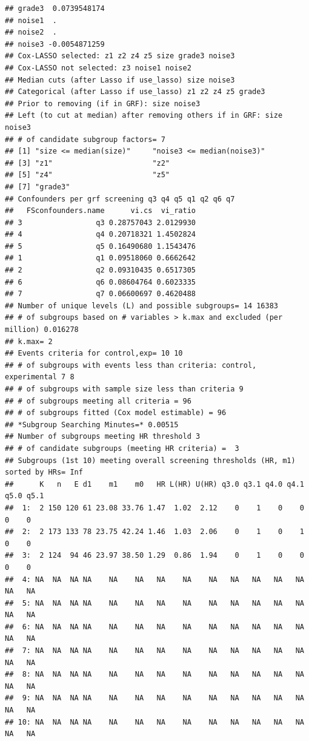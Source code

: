 \documentclass[smallextended]{svjour3}
\makeatletter
\newenvironment{kframe}{%
 \def\at@end@of@kframe{}%
 \ifinner\ifhmode%
  \def\at@end@of@kframe{\end{minipage}}%
  \begin{minipage}{\columnwidth}%
 \fi\fi%
 \def\FrameCommand##1{\hskip\@totalleftmargin \hskip-\fboxsep
 \colorbox{shadecolor}{##1}\hskip-\fboxsep
     \hskip-\linewidth \hskip-\@totalleftmargin \hskip\columnwidth}%
 \MakeFramed {\advance\hsize-\width
   \@totalleftmargin\z@ \linewidth\hsize
   \@setminipage}}%
 {\par\unskip\endMakeFramed%
 \at@end@of@kframe}
\newenvironment{knitrout}{}{} %
\makeatother
\begin{document}
\begin{knitrout}
\begin{kframe}
\begin{verbatim}
## grade3  0.0739548174
## noise1  .           
## noise2  .           
## noise3 -0.0054871259
## Cox-LASSO selected: z1 z2 z4 z5 size grade3 noise3 
## Cox-LASSO not selected: z3 noise1 noise2 
## Median cuts (after Lasso if use_lasso) size noise3 
## Categorical (after Lasso if use_lasso) z1 z2 z4 z5 grade3 
## Prior to removing (if in GRF): size noise3 
## Left (to cut at median) after removing others if in GRF: size noise3 
## # of candidate subgroup factors= 7 
## [1] "size <= median(size)"     "noise3 <= median(noise3)"
## [3] "z1"                       "z2"                      
## [5] "z4"                       "z5"                      
## [7] "grade3"                  
## Confounders per grf screening q3 q4 q5 q1 q2 q6 q7 
##   FSconfounders.name      vi.cs  vi_ratio
## 3                 q3 0.28757043 2.0129930
## 4                 q4 0.20718321 1.4502824
## 5                 q5 0.16490680 1.1543476
## 1                 q1 0.09518060 0.6662642
## 2                 q2 0.09310435 0.6517305
## 6                 q6 0.08604764 0.6023335
## 7                 q7 0.06600697 0.4620488
## Number of unique levels (L) and possible subgroups= 14 16383 
## # of subgroups based on # variables > k.max and excluded (per million) 0.016278 
## k.max= 2 
## Events criteria for control,exp= 10 10 
## # of subgroups with events less than criteria: control, experimental 7 8 
## # of subgroups with sample size less than criteria 9 
## # of subgroups meeting all criteria = 96 
## # of subgroups fitted (Cox model estimable) = 96 
## *Subgroup Searching Minutes=* 0.00515 
## Number of subgroups meeting HR threshold 3 
## # of candidate subgroups (meeting HR criteria) =  3 
## Subgroups (1st 10) meeting overall screening thresholds (HR, m1) sorted by HRs= Inf 
##      K   n   E d1    m1    m0   HR L(HR) U(HR) q3.0 q3.1 q4.0 q4.1 q5.0 q5.1
##  1:  2 150 120 61 23.08 33.76 1.47  1.02  2.12    0    1    0    0    0    0
##  2:  2 173 133 78 23.75 42.24 1.46  1.03  2.06    0    1    0    1    0    0
##  3:  2 124  94 46 23.97 38.50 1.29  0.86  1.94    0    1    0    0    0    0
##  4: NA  NA  NA NA    NA    NA   NA    NA    NA   NA   NA   NA   NA   NA   NA
##  5: NA  NA  NA NA    NA    NA   NA    NA    NA   NA   NA   NA   NA   NA   NA
##  6: NA  NA  NA NA    NA    NA   NA    NA    NA   NA   NA   NA   NA   NA   NA
##  7: NA  NA  NA NA    NA    NA   NA    NA    NA   NA   NA   NA   NA   NA   NA
##  8: NA  NA  NA NA    NA    NA   NA    NA    NA   NA   NA   NA   NA   NA   NA
##  9: NA  NA  NA NA    NA    NA   NA    NA    NA   NA   NA   NA   NA   NA   NA
## 10: NA  NA  NA NA    NA    NA   NA    NA    NA   NA   NA   NA   NA   NA   NA

\end{verbatim}
\end{kframe}
\end{knitrout}
\end{document}
